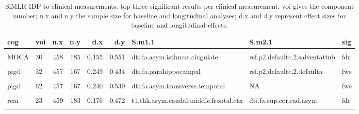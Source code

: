 \documentclass[
  table]{article}
\begin{document}
\begin{landscape}\begin{table}

\caption{\label{tab:updrsresultsSiMLRtab}SiMLR IDP to clinical measurements: top three significant results per clinical measurement. voi gives the component number; n.x and n.y the sample size for baseline and longitudinal analyses; d.x and d.y represent effect sizes for baseline and longitudinal effects.}
\centering
\begin{tabular}[t]{llrrrrlll}
\toprule
cog & voi & n.x & n.y & d.x & d.y & S.m1.1 & S.m2.1 & sig\\
\midrule
\cellcolor{gray!22}{MOCA} & \cellcolor{gray!22}{79} & \cellcolor{gray!22}{458} & \cellcolor{gray!22}{185} & \cellcolor{gray!22}{0.157} & \cellcolor{gray!22}{0.561} & \cellcolor{gray!22}{t1.vol.asym.alecmtl} & \cellcolor{gray!22}{rsf.p2.midbrain.2.sommotb} & \cellcolor{gray!22}{fwe}\\
MOCA & 30 & 458 & 185 & 0.155 & 0.551 & dti.fa.asym.isthmus.cingulate & rsf.p2.defaultc.2.salventattnb & fdr\\
\cellcolor{gray!22}{MOCA} & \cellcolor{gray!22}{96} & \cellcolor{gray!22}{458} & \cellcolor{gray!22}{185} & \cellcolor{gray!22}{0.189} & \cellcolor{gray!22}{0.468} & \cellcolor{gray!22}{dti.fa.ant.cor.rad.asym} & \cellcolor{gray!22}{rsf.p2.limbica.2.dorsattna} & \cellcolor{gray!22}{fdr}\\
pigd & 32 & 457 & 167 & 0.249 & 0.434 & dti.fa.parahippocampal & rsf.p2.defaultc.2.defaulta & fwe\\
\cellcolor{gray!22}{pigd} & \cellcolor{gray!22}{61} & \cellcolor{gray!22}{457} & \cellcolor{gray!22}{167} & \cellcolor{gray!22}{0.272} & \cellcolor{gray!22}{0.661} & \cellcolor{gray!22}{dti.fa.asym.paracent} & \cellcolor{gray!22}{NA} & \cellcolor{gray!22}{fwe}\\
\addlinespace
pigd & 62 & 457 & 167 & 0.240 & 0.539 & dti.fa.asym.transverse.temporal & NA & fwe\\
\cellcolor{gray!22}{rem} & \cellcolor{gray!22}{81} & \cellcolor{gray!22}{459} & \cellcolor{gray!22}{183} & \cellcolor{gray!22}{0.122} & \cellcolor{gray!22}{0.489} & \cellcolor{gray!22}{t1.thk.asym.pars.triangularis.ctx} & \cellcolor{gray!22}{dti.fa.inf.cereb.ped.asym} & \cellcolor{gray!22}{fwe}\\
rem & 23 & 459 & 183 & 0.176 & 0.472 & t1.thk.asym.caudal.middle.frontal.ctx & dti.fa.sup.cor.rad.asym & fdr\\
\cellcolor{gray!22}{rem} & \cellcolor{gray!22}{11} & \cellcolor{gray!22}{459} & \cellcolor{gray!22}{183} & \cellcolor{gray!22}{0.182} & \cellcolor{gray!22}{0.562} & \cellcolor{gray!22}{dti.fa.post.int.cap.asym} & \cellcolor{gray!22}{t1.thk.bn.gp.gpe.asymdp.} & \cellcolor{gray!22}{fdr}\\

\end{tabular}
\end{table}
\end{landscape}
\end{document}
